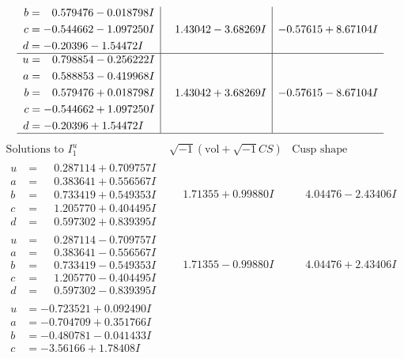 \documentclass[1p]{elsarticle_modified}
\theoremstyle{definition}
\newcommand{\I}{\sqrt{-1}}
\begin{document}
$$\begin{array}{c|c|c}
\begin{aligned}
b &= \phantom{-}0.579476 - 0.018798 I \\
c &= -0.544662 - 1.097250 I \\
d &= -0.20396 - 1.54472 I\end{aligned}
 & \phantom{-}1.43042 - 3.68269 I & -0.57615 + 8.67104 I \\ \hline\begin{aligned}
u &= \phantom{-}0.798854 - 0.256222 I \\
a &= \phantom{-}0.588853 - 0.419968 I \\
b &= \phantom{-}0.579476 + 0.018798 I \\
c &= -0.544662 + 1.097250 I \\
d &= -0.20396 + 1.54472 I\end{aligned}
 & \phantom{-}1.43042 + 3.68269 I & -0.57615 - 8.67104 I\\
 \hline 
 \end{array}$$\newpage$$\begin{array}{c|c|c}  
\text{Solutions to }I^u_{1}& \I (\text{vol} + \sqrt{-1}CS) & \text{Cusp shape}\\
 \hline 
\begin{aligned}
u &= \phantom{-}0.287114 + 0.709757 I \\
a &= \phantom{-}0.383641 + 0.556567 I \\
b &= \phantom{-}0.733419 + 0.549353 I \\
c &= \phantom{-}1.205770 + 0.404495 I \\
d &= \phantom{-}0.597302 + 0.839395 I\end{aligned}
 & \phantom{-}1.71355 + 0.99880 I & \phantom{-}4.04476 - 2.43406 I \\ \hline\begin{aligned}
u &= \phantom{-}0.287114 - 0.709757 I \\
a &= \phantom{-}0.383641 - 0.556567 I \\
b &= \phantom{-}0.733419 - 0.549353 I \\
c &= \phantom{-}1.205770 - 0.404495 I \\
d &= \phantom{-}0.597302 - 0.839395 I\end{aligned}
 & \phantom{-}1.71355 - 0.99880 I & \phantom{-}4.04476 + 2.43406 I \\ \hline\begin{aligned}
u &= -0.723521 + 0.092490 I \\
a &= -0.704709 + 0.351766 I \\
b &= -0.480781 - 0.041433 I \\
c &= -3.56166 + 1.78408 I \\

\end{aligned}
\end{array}$$
\end{document}

